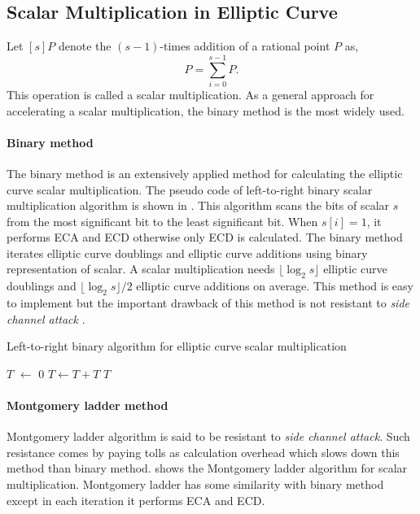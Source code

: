 \subsection{Scalar Multiplication in Elliptic Curve}
\label{sec:chap:fund:scm}
Let $[s]P$ denote the $(s-1)$-times addition of a rational point $P$ as, 
\begin{equation}
[s]P = \sum_{i = 0}^{s-1}{P}.
\end{equation}
This operation is called a scalar multiplication.
As a general approach for accelerating a scalar multiplication, the binary method is the most widely used.

\paragraph{Binary method}
\label{sec:chap:fund:binscm}
The binary method is an extensively applied method for calculating the elliptic curve scalar multiplication. 
 The pseudo code of left-to-right binary scalar multiplication algorithm is shown in . 
 This algorithm scans the bits of scalar $s$ from the  most significant bit to the least significant bit. When $s[i] = 1$, it  performs ECA and ECD otherwise only ECD is calculated. 
 The binary method iterates elliptic curve doublings and elliptic curve additions using binary representation of scalar.
 A scalar multiplication needs $\lfloor \log_2 s\rfloor$ elliptic curve doublings and $\lfloor \log_2 s\rfloor/2$ elliptic curve additions on average.
  This method is easy to implement but the important drawback of this method is not resistant to \textit{side channel attack} \cite{C:Kocher96}.  

\begin{algorithm}[ht]
	\caption{Left-to-right binary algorithm for elliptic curve scalar multiplication}
	\label{alg:binary_scm_chap_fundamental}
	\DontPrintSemicolon
	 $T$ $ \leftarrow$ $0$ \;
	  {\;
				$T \leftarrow T  + T$\;
		     }
	  $T$\;
\end{algorithm}

\paragraph{Montgomery ladder method}
\label{sec:chap:fund:montscm}
Montgomery ladder algorithm is said to be resistant to \textit{side channel attack}. Such resistance comes by paying tolls as calculation overhead which slows down this method than binary method.   shows the Montgomery ladder algorithm for scalar multiplication. Montgomery ladder has some similarity with binary method except in each iteration it performs ECA and ECD. 

